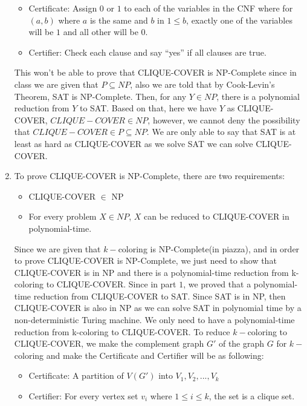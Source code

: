 \documentclass[11pt]{article}
\begin{document}
\begin{solution}
\begin{enumerate}
\begin{itemize}
            \item Certificate: Assign $0$ or $1$ to each of the variables in the CNF where for $(a,b)$ where $a$ is the same and $b$ in $1\leq b$, exactly one of the variables will be $1$ and all other will be $0$.
            \item Certifier: Check each clause and say “yes” if all clauses are true.
        \end{itemize}
        \newline
        \newline
        This won't be able to prove that CLIQUE-COVER is NP-Complete since in class we are given that $P \subseteq NP$, also we are told that by Cook-Levin's Theorem, SAT is NP-Complete. Then, for any $Y \in NP$, there is a polynomial reduction from $Y$ to SAT. Based on that, here we have $Y$ as CLIQUE-COVER, $CLIQUE-COVER \in NP$, however, we cannot deny the possibility that $CLIQUE-COVER \in P \subseteq NP$. We are only able to say that SAT is at least as hard as CLIQUE-COVER as we solve SAT we can solve CLIQUE-COVER.
    \item 
        To prove CLIQUE-COVER is NP-Complete, there are two requirements:
        \begin{itemize}
            \item CLIQUE-COVER $\in$ NP
            \item For every problem $X \in NP$, $X$ can be reduced to CLIQUE-COVER in polynomial-time.
        \end{itemize}
        Since we are given that $k-$coloring is NP-Complete(in piazza), and in order to prove CLIQUE-COVER is NP-Complete, we just need to show that CLIQUE-COVER is in NP and there is a polynomial-time reduction from k-coloring to CLIQUE-COVER. Since in part $1$, we proved that a polynomial-time reduction from CLIQUE-COVER to SAT. Since SAT is in NP, then CLIQUE-COVER is also in NP as we can solve SAT in polynomial time by a non-deterministic Turing machine. We only need to have a polynomial-time reduction from k-coloring to CLIQUE-COVER.
        \newline
        \newline
        To reduce $k-$coloring to CLIQUE-COVER, we make the complement graph $G'$ of the graph $G$ for $k-$coloring and make the Certificate and Certifier will be as following:\begin{itemize}
            \item Certificate: A partition of $V(G')$ into $V_1,V_2,...,V_k$
            \item Certifier: For every vertex set $v_i$ where $1 \leq i \leq k$, the set is a clique set.

\end{itemize}
\end{enumerate}
\end{solution}
\end{document}
